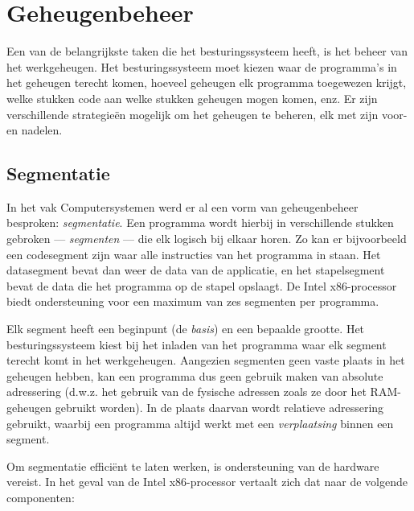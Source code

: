 \chapter{Geheugenbeheer}

Een van de belangrijkste taken die het besturingssysteem heeft, is het beheer
van het werkgeheugen. Het besturingssysteem moet kiezen waar de programma's in
het geheugen terecht komen, hoeveel geheugen elk programma toegewezen krijgt,
welke stukken code aan welke stukken geheugen mogen komen, enz. Er zijn
verschillende strategie\"en mogelijk om het geheugen te beheren, elk met zijn
voor- en nadelen.



\section{Segmentatie}

In het vak Computersystemen werd er al een vorm van geheugenbeheer besproken:
\emph{segmentatie}. Een programma wordt hierbij in verschillende stukken
gebroken --- \emph{segmenten} --- die elk logisch bij elkaar horen. Zo kan er bijvoorbeeld een
codesegment zijn waar alle instructies van het programma in staan. Het
datasegment bevat dan weer de data van de applicatie, en het stapelsegment bevat
de data die het programma op de stapel opslaagt. De Intel x86-processor biedt
ondersteuning voor een maximum van zes segmenten per programma.

Elk segment heeft een beginpunt (de \emph{basis}) en een bepaalde grootte. Het
besturingssysteem kiest bij het inladen van het programma waar elk segment
terecht komt in het werkgeheugen. Aangezien segmenten geen vaste plaats in het geheugen hebben, kan
een programma dus geen gebruik maken van absolute adressering (d.w.z. het
gebruik van de fysische adressen zoals ze door het RAM-geheugen gebruikt
worden). In de plaats daarvan wordt relatieve adressering gebruikt, waarbij een
programma altijd werkt met een \emph{verplaatsing} binnen een segment.

Om segmentatie effici\"ent te laten werken, is ondersteuning van de hardware
vereist. In het geval van de Intel x86-processor vertaalt zich dat naar de
volgende componenten:

